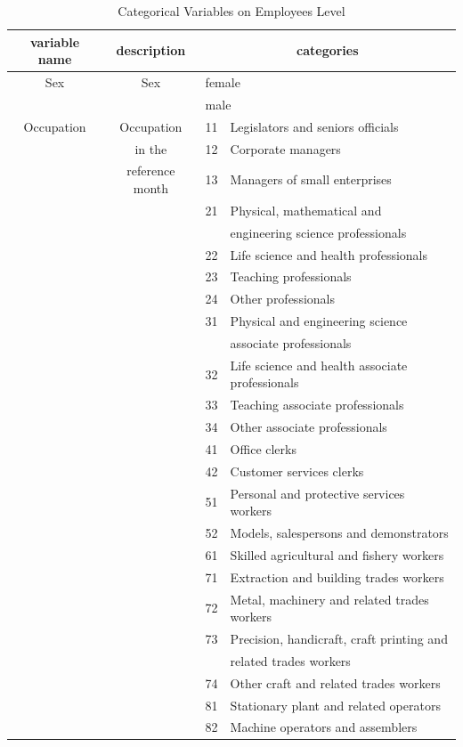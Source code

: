 \documentclass[12pt]{article}
\begin{document}
\begin{table}%
\caption{Categorical Variables on Employees Level}
\begin{center}
\begin{tabular}{|c|c|l l|}
\hline
\hline variable name & description & \multicolumn{2}{|c|}{categories} \\
\hline
\hline Sex & Sex & \multicolumn{2}{|l|}{female} \\
 & & \multicolumn{2}{|l|}{male} \\
\hline Occupation & Occupation & 11 & Legislators and seniors officials \\
& in the & 12 & Corporate managers  \\
& reference month & 13 & Managers of small enterprises \\
&& 21 & Physical, mathematical and \\ 
&&& engineering science professionals \\
&& 22 & Life science and health professionals \\ 
&& 23 & Teaching professionals \\
&& 24 & Other professionals \\
&& 31 & Physical and engineering science    \\ 
&&&  associate professionals \\
&& 32 & Life science and health associate professionals \\ 
&& 33 & Teaching associate professionals \\ 
&& 34 & Other associate professionals \\
&& 41 & Office clerks \\ 
&& 42 & Customer services clerks \\
&& 51 & Personal and protective services workers \\ 
&& 52 & Models, salespersons and demonstrators \\
&& 61 & Skilled agricultural and fishery workers \\ 
&& 71 & Extraction and building trades workers \\ 
&& 72 & Metal, machinery and related trades workers \\
&& 73 & Precision, handicraft, craft printing and \\ 
&&& related trades workers \\
&& 74 & Other craft and related trades workers \\
&& 81 & Stationary plant and related operators \\
&& 82 & Machine operators and assemblers \\

\end{tabular}
\end{center}
\end{table}
\end{document}
